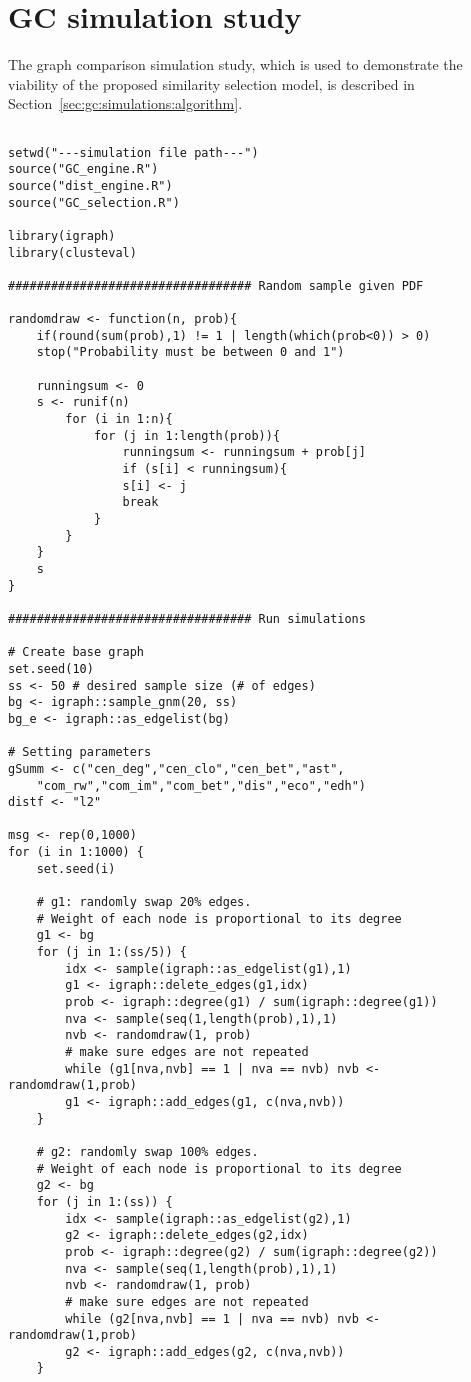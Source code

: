 \section{GC simulation study}
\label{sec:appendicies:gc:simulations}

The graph comparison simulation study, which is used to demonstrate the 
viability of the 
proposed similarity selection model, is described in 
Section~\ref{sec:gc:simulations:algorithm}.

{
\begin{lstlisting}

setwd("---simulation file path---")
source("GC_engine.R")
source("dist_engine.R")
source("GC_selection.R")

library(igraph)
library(clusteval)

################################## Random sample given PDF

randomdraw <- function(n, prob){
	if(round(sum(prob),1) != 1 | length(which(prob<0)) > 0) 
	stop("Probability must be between 0 and 1")
	
	runningsum <- 0
	s <- runif(n)
		for (i in 1:n){
			for (j in 1:length(prob)){
				runningsum <- runningsum + prob[j]
				if (s[i] < runningsum){
				s[i] <- j
				break
			} 
		}
	}
	s
}

################################## Run simulations

# Create base graph
set.seed(10)
ss <- 50 # desired sample size (# of edges)
bg <- igraph::sample_gnm(20, ss)
bg_e <- igraph::as_edgelist(bg)

# Setting parameters
gSumm <- c("cen_deg","cen_clo","cen_bet","ast",
	"com_rw","com_im","com_bet","dis","eco","edh")
distf <- "l2"

msg <- rep(0,1000)
for (i in 1:1000) {
	set.seed(i)
	
	# g1: randomly swap 20% edges. 
	# Weight of each node is proportional to its degree
	g1 <- bg
	for (j in 1:(ss/5)) {
		idx <- sample(igraph::as_edgelist(g1),1)
		g1 <- igraph::delete_edges(g1,idx)
		prob <- igraph::degree(g1) / sum(igraph::degree(g1))
		nva <- sample(seq(1,length(prob),1),1)
		nvb <- randomdraw(1, prob)
		# make sure edges are not repeated
		while (g1[nva,nvb] == 1 | nva == nvb) nvb <- randomdraw(1,prob)
		g1 <- igraph::add_edges(g1, c(nva,nvb))
	}
	
	# g2: randomly swap 100% edges. 
	# Weight of each node is proportional to its degree
	g2 <- bg
	for (j in 1:(ss)) {
		idx <- sample(igraph::as_edgelist(g2),1)
		g2 <- igraph::delete_edges(g2,idx)
		prob <- igraph::degree(g2) / sum(igraph::degree(g2))
		nva <- sample(seq(1,length(prob),1),1)
		nvb <- randomdraw(1, prob)
		# make sure edges are not repeated
		while (g2[nva,nvb] == 1 | nva == nvb) nvb <- randomdraw(1,prob)
		g2 <- igraph::add_edges(g2, c(nva,nvb))
	}
	

\end{lstlisting}}
